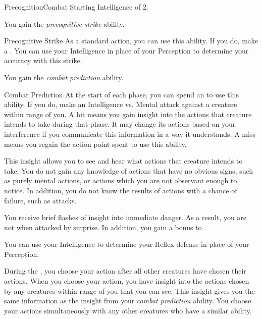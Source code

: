     \begin{feat}{Precognition}{Combat}
        \featpre Starting Intelligence of 2.

         You gain the \textit{precognitive strike} ability.
        \begin{ability}{Precognitive Strike}
            As a standard action, you can use this ability.
            If you do, make a .
            You can use your Intelligence in place of your Perception to determine your accuracy with this strike.
        \end{ability}

         You gain the \textit{combat prediction} ability.
        \begin{ability}{Combat Prediction}
            At the start of each phase, you can spend an  to use this ability.
            If you do, make an Intelligence vs. Mental attack against a creature within \rngmed range of you.
            A hit means you gain insight into the actions that creature intends to take during that phase.
            It may change its actions based on your interference if you communicate this information in a way it understands.
            A miss means you regain the action point spent to use this ability.

            This insight allows you to see and hear what actions that creature intends to take.
            You do not gain any knowledge of actions that have no obvious signs, such as purely mental actions, or actions which you are not observant enough to notice.
            In addition, you do not know the results of actions with a chance of failure, such as attacks.
        \end{ability}

         You receive brief flashes of insight into immediate danger.
        As a result, you are not  when attacked by surprise.
        In addition, you gain a  bonus to .

         You can use your Intelligence to determine your Reflex defense in place of your Perception.

         During the , you choose your action after all other creatures have chosen their actions.
        When you choose your action, you have insight into the actions chosen by any creatures within \rngclose range of you that you can see.
        This insight gives you the same information as the insight from your \textit{combat prediction} ability.
        You choose your actions simultaneously with any other creatures who have a similar ability.


\end{feat}
